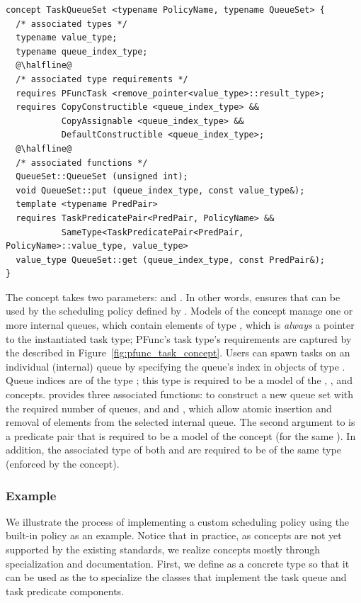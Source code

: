 \begin{lstlisting}[columns=flexible]
concept TaskQueueSet <typename PolicyName, typename QueueSet> {
  /* associated types */
  typename value_type;
  typename queue_index_type;
  @\halfline@
  /* associated type requirements */
  requires PFuncTask <remove_pointer<value_type>::result_type>;
  requires CopyConstructible <queue_index_type> && 
           CopyAssignable <queue_index_type> &&
           DefaultConstructible <queue_index_type>;
  @\halfline@
  /* associated functions */
  QueueSet::QueueSet (unsigned int);
  void QueueSet::put (queue_index_type, const value_type&);
  template <typename PredPair>
  requires TaskPredicatePair<PredPair, PolicyName> &&
           SameType<TaskPredicatePair<PredPair, PolicyName>::value_type, value_type>
  value_type QueueSet::get (queue_index_type, const PredPair&);
}
\end{lstlisting}

The  concept takes two parameters: 
and .
%
In other words,  ensures that  can
be used by the scheduling policy defined by .
%
Models of the  concept manage one or more internal
queues, which contain elements of type , which is
\textit{always} a pointer to the instantiated task type; PFunc's task type's
requirements are captured by the  described in
Figure~\ref{fig:pfunc_task_concept}.
%
Users can spawn tasks on an individual (internal) queue by specifying the
queue's index in objects of type .
%
Queue indices are of the type ; this type is required
to be a model of the , ,
and  concepts.
%
 provides three associated functions:
 to construct a new queue set with the required number
of queues, and  and , which allow
atomic insertion and removal of elements from the selected internal queue.
%
The second argument to  is a predicate pair that is
required to be a model of the  concept (for the
same ).
%
In addition, the  associated type of both 
and  are required to be of the same type (enforced by the
 concept).
%

\subsubsection{Example}
\label{subsubsec:scheduling_example}
%
We illustrate the process of implementing a custom scheduling policy using the
built-in  policy as an example. 
%
Notice that in practice, as concepts are not yet supported by the existing 
\Cpp{} standards, we realize concepts mostly through specialization and 
documentation.
%
First, we define  as a concrete type so that it can be used as the
 to specialize the classes that implement the task queue and
task predicate components.
%

